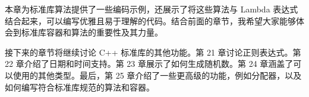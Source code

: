 本章为标准库算法提供了一些编码示例，还展示了将这些算法与 Lambda 表达式结合起来，可以编写优雅且易于理解的代码。结合前面的章节，我希望大家能够体会到标准库容器和算法的重要性及其力量。

接下来的章节将继续讨论 C++ 标准库的其他功能。第 21 章讨论正则表达式。第 22 章介绍了日期和时间支持。第 23 章展示了如何生成随机数。第 24 章涵盖了可以使用的其他类型。最后，第 25 章介绍了一些更高级的功能，例如分配器，以及如何编写符合标准库规范的算法和容器。